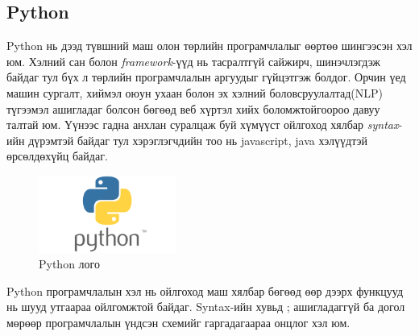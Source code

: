 \subsection{Python}
Python нь дээд түвшний маш олон төрлийн програмчлалыг өөртөө шингээсэн хэл юм. Хэлний сан болон \textit{framework}-үүд нь тасралтгүй сайжирч, шинэчлэгдэж байдаг тул бүх л төрлийн програмчлалын аргуудыг гүйцэтгэж болдог. Орчин үед машин сургалт, хиймэл оюун ухаан болон эх хэлний боловсруулалтад(NLP) түгээмэл ашигладаг болсон бөгөөд веб хүртэл хийх боломжтойгоороо давуу талтай юм. Үүнээс гадна анхлан суралцаж буй хүмүүст ойлгоход хялбар \textit{syntax}-ийн дүрэмтэй байдаг тул хэрэглэгчдийн тоо нь javascript, java хэлүүдтэй өрсөлдөхүйц байдаг. 
\begin{figure}[ht]
  \centering
  \includegraphics[width=4.5cm]{images/pythonLogo.png}
  \caption{Python лого}
  \label{fig:pythonLogo}
\end{figure}

Python програмчлалын хэл нь ойлгоход маш хялбар бөгөөд өөр дээрх функцууд нь шууд утгаараа ойлгомжтой байдаг. Syntax-ийн хувьд ; ашигладаггүй ба догол мөрөөр програмчлалын үндсэн схемийг гаргадагаараа онцлог хэл юм.
